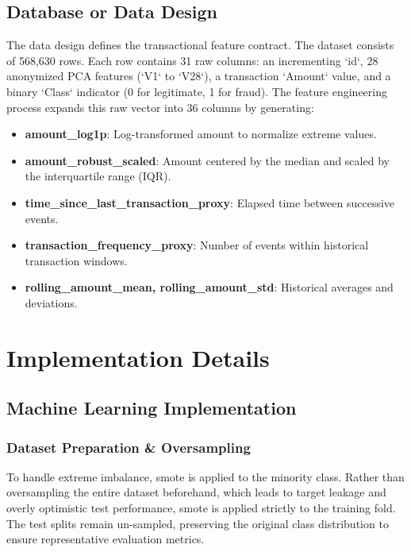\subsection{Database or Data Design}
The data design defines the transactional feature contract. The dataset consists of 568,630 rows. Each row contains 31 raw columns: an incrementing `id`, 28 anonymized PCA features (`V1` to `V28`), a transaction `Amount` value, and a binary `Class` indicator (0 for legitimate, 1 for fraud). The feature engineering process expands this raw vector into 36 columns by generating:
\begin{itemize}
    \item \textbf{amount\_log1p}: Log-transformed amount to normalize extreme values.
    \item \textbf{amount\_robust\_scaled}: Amount centered by the median and scaled by the interquartile range (IQR).
    \item \textbf{time\_since\_last\_transaction\_proxy}: Elapsed time between successive events.
    \item \textbf{transaction\_frequency\_proxy}: Number of events within historical transaction windows.
    \item \textbf{rolling\_amount\_mean, rolling\_amount\_std}: Historical averages and deviations.
\end{itemize}

\section{Implementation Details}

\subsection{Machine Learning Implementation}

\subsubsection{Dataset Preparation \& Oversampling}
To handle extreme imbalance, \gls{smote} is applied to the minority class. Rather than oversampling the entire dataset beforehand, which leads to target leakage and overly optimistic test performance, \gls{smote} is applied strictly to the training fold. The test splits remain un-sampled, preserving the original class distribution to ensure representative evaluation metrics.

